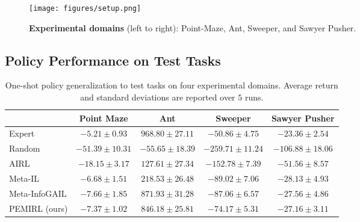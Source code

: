 \begin{figure*}[!t]
    \centering
    \texttt{[image: figures/setup.png]}
\caption{\textbf{Experimental domains} (left to right):
Point-Maze, Ant, Sweeper, and Sawyer Pusher. 
    }
\label{fig:setup}
\end{figure*}

\subsection{Policy Performance on Test Tasks}
\label{sec:imitation_results}

\begin{table}[h]
    \begin{center}
\begin{small}
    \begin{tabular}{l|c|c|c|c}
    \toprule
        & Point Maze & Ant & Sweeper & Sawyer Pusher  \\
      \midrule
      Expert & $-5.21 \pm 0.93$ & $968.80 \pm 27.11$ & $-50.86 \pm 4.75$ & $-23.36 \pm 2.54$\\
Random & $-51.39 \pm 10.31$ & $-55.65 \pm 18.39$ & $-259.71 \pm 11.24$ & $-106.88 \pm 18.06$\\
      \midrule
      AIRL~\cite{fu2017learning} & $-18.15 \pm 3.17$ & $127.61 \pm 27.34$ & $-152.78 \pm 7.39$ & $-51.56 \pm 8.57$\\
Meta-IL & $\mathbf{-6.68} \pm 1.51$ & $218.53 \pm 26.48$ & $-89.02 \pm 7.06$ & $-28.13 \pm 4.93$\\
Meta-InfoGAIL & $-7.66 \pm 1.85$ & $\mathbf{871.93} \pm 31.28$ & $-87.06 \pm 6.57$ & $-27.56 \pm 4.86$\\
PEMIRL (ours) & $-7.37 \pm 1.02$ & $846.18 \pm 25.81$ & $\mathbf{-74.17} \pm 5.31$ & $\mathbf{-27.16} \pm 3.11$ \\
      \bottomrule
    \end{tabular}
    \end{small}
    \end{center}
    \vspace{0.2cm}
    \caption{One-shot policy generalization to test tasks on four experimental domains.
    Average return and standard deviations are reported over $5$ runs.}
\label{tbl:imitation_results}
\end{table}

